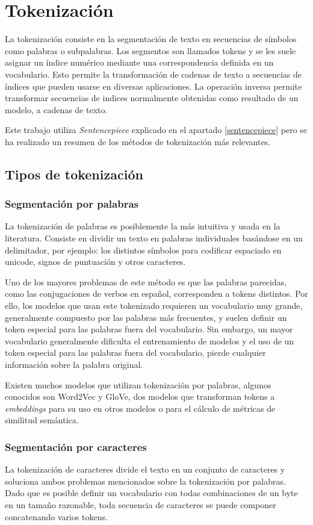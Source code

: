 \section{Tokenización}\label{tokenization}
La tokenización consiste en la segmentación de texto en secuencias de símbolos como palabras o subpalabras. Los segmentos son llamados tokens y se les suele asignar un índice numérico mediante una correspondencia definida en un vocabulario. Esto permite la transformación de cadenas de texto a secuencias de índices que pueden usarse en diversas aplicaciones. La operación inversa permite transformar secuencias de indices normalmente obtenidas como resultado de un modelo, a cadenas de texto.

Este trabajo utiliza \textit{Sentencepiece} explicado en el apartado \ref{sentencepiece} pero se ha realizado un resumen de los métodos de tokenización más relevantes.

\subsection{Tipos de tokenización}
\subsubsection{Segmentación por palabras}
La tokenización de palabras es posiblemente la más intuitiva y usada en la literatura. Consiste en dividir un texto en palabras individuales basándose en un delimitador, por ejemplo: los distintos símbolos para codificar espaciado en unicode, signos de puntuación y otros caracteres.

Uno de los mayores problemas de este método es que las palabras parecidas, como las conjugaciones de verbos en español, corresponden a tokens distintos. Por ello, los modelos que usan este tokenizado requieren un vocabulario muy grande, generalmente compuesto por las palabras más frecuentes, y suelen definir un token especial para las palabras fuera del vocabulario. Sin embargo, un mayor vocabulario generalmente dificulta el entrenamiento de modelos y el uso de un token especial para las palabras fuera del vocabulario, pierde cualquier información sobre la palabra original.

Existen muchos modelos que utilizan tokenización por palabras, algunos conocidos son Word2Vec y GloVe, dos modelos que transforman tokens a \textit{embeddings} para su uso en otros modelos o para el cálculo de métricas de similitud semántica.

\subsubsection{Segmentación por caracteres}
La tokenización de caracteres divide el texto en un conjunto de caracteres y soluciona ambos problemas mencionados sobre la tokenización por palabras. Dado que es posible definir un vocabulario con todas combinaciones de un byte en un tamaño razonable, toda secuencia de caracteres se puede componer concatenando varios tokens.

